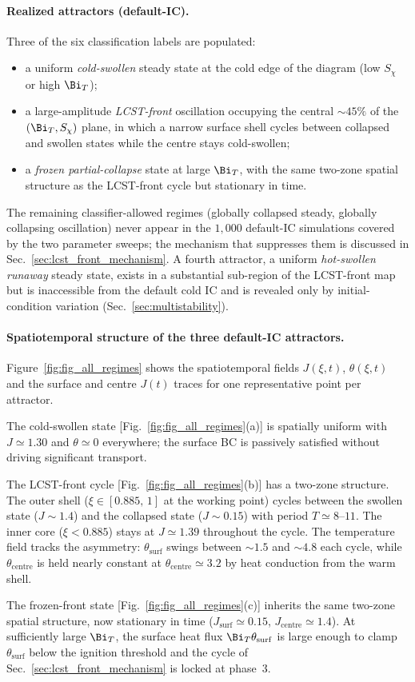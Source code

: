 \paragraph{Realized attractors (default-IC).}
Three of the six classification labels are populated:
\begin{itemize}
\item[(i)] a uniform \emph{cold-swollen} steady state at the cold
  edge of the diagram (low $S_\chi$ or high $\Bi_T$);
\item[(ii)] a large-amplitude \emph{LCST-front} oscillation occupying
  the central $\sim\!45\%$ of the $(\Bi_T,S_\chi)$ plane, in which a
  narrow surface shell cycles between collapsed and swollen states
  while the centre stays cold-swollen;
\item[(iii)] a \emph{frozen partial-collapse} state at large $\Bi_T$,
  with the same two-zone spatial structure as the LCST-front cycle
  but stationary in time.
\end{itemize}
The remaining classifier-allowed regimes (globally collapsed steady,
globally collapsing oscillation) never appear in the $1{,}000$
default-IC simulations covered by the two parameter sweeps; the
mechanism that suppresses them is discussed in
Sec.~\ref{sec:lcst_front_mechanism}.  A fourth attractor, a uniform
\emph{hot-swollen runaway} steady state, exists in a substantial
sub-region of the LCST-front map but is inaccessible from the
default cold IC and is revealed only by initial-condition variation
(Sec.~\ref{sec:multistability}).

\paragraph{Spatiotemporal structure of the three default-IC
attractors.}
Figure~\ref{fig:fig_all_regimes} shows the spatiotemporal fields
$J(\xi,t)$, $\theta(\xi,t)$ and the surface and centre $J(t)$ traces
for one representative point per attractor.

The cold-swollen state [Fig.~\ref{fig:fig_all_regimes}(a)] is
spatially uniform with $J\!\simeq\!1.30$ and $\theta\!\simeq\!0$
everywhere; the surface BC is passively satisfied without driving
significant transport.

The LCST-front cycle [Fig.~\ref{fig:fig_all_regimes}(b)] has a
two-zone structure.  The outer shell ($\xi\!\in\![0.885,\,1]$ at
the working point) cycles between the swollen state
($J\!\sim\!1.4$) and the collapsed state ($J\!\sim\!0.15$) with
period $T\!\simeq\!8\text{--}11$.  The inner core ($\xi<0.885$)
stays at $J\!\simeq\!1.39$ throughout the cycle.  The temperature
field tracks the asymmetry: $\theta_\mathrm{surf}$ swings between
$\sim\!1.5$ and $\sim\!4.8$ each cycle, while
$\theta_\mathrm{centre}$ is held nearly constant at
$\theta_\mathrm{centre}\!\simeq\!3.2$ by heat conduction from the
warm shell.

The frozen-front state [Fig.~\ref{fig:fig_all_regimes}(c)] inherits
the same two-zone spatial structure, now stationary in time
($J_\mathrm{surf}\!\simeq\!0.15$,
$J_\mathrm{centre}\!\simeq\!1.4$).  At sufficiently large $\Bi_T$,
the surface heat flux $\Bi_T\theta_\mathrm{surf}$ is large enough
to clamp $\theta_\mathrm{surf}$ below the ignition threshold and
the cycle of Sec.~\ref{sec:lcst_front_mechanism} is locked at
phase~3.
